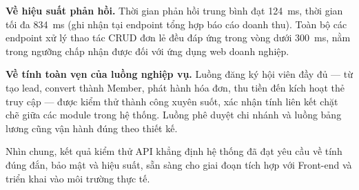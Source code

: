 \textbf{Về hiệu suất phản hồi.} Thời gian phản hồi trung bình đạt 124~ms, thời gian tối đa 834~ms (ghi nhận tại endpoint tổng hợp báo cáo doanh thu). Toàn bộ các endpoint xử lý thao tác CRUD đơn lẻ đều đáp ứng trong vòng dưới 300~ms, nằm trong ngưỡng chấp nhận được đối với ứng dụng web doanh nghiệp.

\textbf{Về tính toàn vẹn của luồng nghiệp vụ.} Luồng đăng ký hội viên đầy đủ — từ tạo lead, convert thành Member, phát hành hóa đơn, thu tiền đến kích hoạt thẻ truy cập — được kiểm thử thành công xuyên suốt, xác nhận tính liên kết chặt chẽ giữa các module trong hệ thống. Luồng phê duyệt chi nhánh và luồng bảng lương cũng vận hành đúng theo thiết kế.

Nhìn chung, kết quả kiểm thử API khẳng định hệ thống đã đạt yêu cầu về tính đúng đắn, bảo mật và hiệu suất, sẵn sàng cho giai đoạn tích hợp với Front-end và triển khai vào môi trường thực tế.
